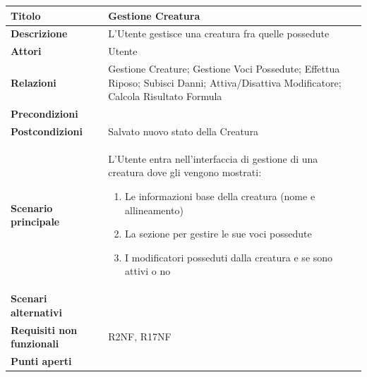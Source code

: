 \documentclass[a4paper, 11pt]{article}
\begin{document}
\begin{center}
\begin{tabular}{ |p{5cm}|p{9.5cm}|  }
\hline
\textbf{Titolo} & Gestione Creatura \\
\hline
\textbf{Descrizione} & L'Utente gestisce una creatura fra quelle possedute \\
\hline
\textbf{Attori} & Utente \\
\hline
\textbf{Relazioni} & Gestione Creature; Gestione Voci Possedute; Effettua Riposo; Subisci Danni; Attiva/Disattiva Modificatore; Calcola Risultato Formula \\
\hline
\textbf{Precondizioni} & \\
\hline
\textbf{Postcondizioni} & Salvato nuovo stato della Creatura\\
\hline
\textbf{Scenario principale} & L'Utente entra nell'interfaccia di gestione di una creatura dove gli vengono mostrati:
\begin{enumerate}
    \item Le informazioni base della creatura (nome e allineamento)
    \item La sezione per gestire le sue voci possedute
    \item I modificatori posseduti dalla creatura e se sono attivi o no
\end{enumerate} \\
\hline
\textbf{Scenari alternativi} & \\
\hline
\textbf{Requisiti non funzionali} & R2NF, R17NF\\
\hline
\textbf{Punti aperti} &  \\
\hline
\end{tabular}

\vspace{3em}


\end{center}
\end{document}
